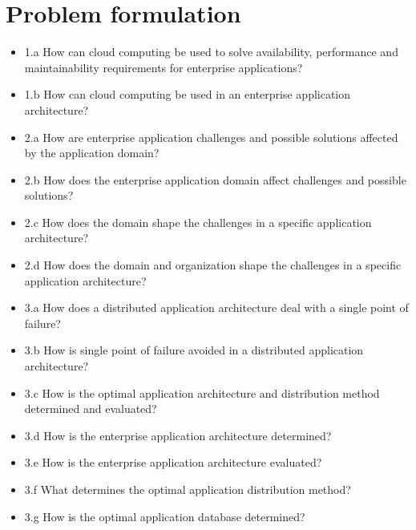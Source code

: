 \section{Problem formulation}
\label{sc:problem_formulation}

\begin{itemize}  
\item 1.a How can cloud computing be used to solve availability, performance and maintainability requirements for enterprise applications?
\item 1.b How can cloud computing be used in an enterprise application architecture?

\item 2.a How are enterprise application challenges and possible solutions affected by the application domain?
\item 2.b How does the enterprise application domain affect challenges and possible solutions?
\item 2.c How does the domain shape the challenges in a specific application architecture?
\item 2.d How does the domain and organization shape the challenges in a specific application architecture?

\item 3.a How does a distributed application architecture deal with a single point of failure?
\item 3.b How is single point of failure avoided in a distributed application architecture?
\item 3.c How is the optimal application architecture and distribution method determined and evaluated?
\item 3.d How is the enterprise application architecture determined?
\item 3.e How is the enterprise application architecture evaluated?
\item 3.f What determines the optimal application distribution method?
\item 3.g How is the optimal application database determined?
\end{itemize}